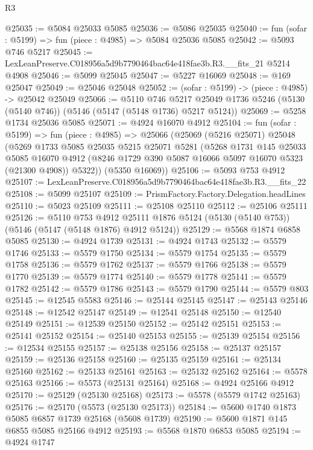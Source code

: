 \begin{lexlean}{R3}
\begin{coremodule}
@25035 := @5084 @25033 @5085
@25036 := @5086 @25035
@25040 := fun (sofar : @5199) => fun (piece : @4985) => @5084 @25036 @5085
@25042 := @5093 @746 @5217
@25045 := LexLeanPreserve.C018956a5d9b7790464bac64e418fae3b.R3.__fits_21 @5214 @4908
@25046 := @5099 @25045
@25047 := @5227 @16069
@25048 := @169 @25047
@25049 := @25046 @25048
@25052 := (sofar : @5199) -> (piece : @4985) -> @25042 @25049
@25066 := @5110
    @746
    @5217
    @25049
    @1736
    @5246
    (@5130 (@5140 @746))
    (@5146 (@5147 (@5148 @1736) @5217 @5124))
@25069 := @5258 @1734 @25036 @5085
@25071 := @4924 @16070 @4912
@25104 := fun (sofar : @5199) =>
  fun (piece : @4985) =>
  @25066
    (@25069
      (@5216 @25071)
      @25048
      (@5269
        @1733
        @5085
        @25035
        @5215
        @25071
        @5281
        (@5268
          @1731
          @145
          @25033
          @5085
          @16070
          @4912
          (@8246 @1729 @390 @5087 @16066 @5097 @16070 @5323 (@21300 @4908))
          @5322))
      (@5350 @16069))
@25106 := @5093 @753 @4912
@25107 := LexLeanPreserve.C018956a5d9b7790464bac64e418fae3b.R3.__fits_22
@25108 := @5099 @25107
@25109 := PrismFactory.Factory.Delegation.headLines
@25110 := @5023 @25109
@25111 := @25108 @25110
@25112 := @25106 @25111
@25126 := @5110
    @753
    @4912
    @25111
    @1876
    @5124
    (@5130 (@5140 @753))
    (@5146 (@5147 (@5148 @1876) @4912 @5124))
@25129 := @5568 @1874 @6858 @5085
@25130 := @4924 @1739
@25131 := @4924 @1743
@25132 := @5579 @1746
@25133 := @5579 @1750
@25134 := @5579 @1754
@25135 := @5579 @1758
@25136 := @5579 @1762
@25137 := @5579 @1766
@25138 := @5579 @1770
@25139 := @5579 @1774
@25140 := @5579 @1778
@25141 := @5579 @1782
@25142 := @5579 @1786
@25143 := @5579 @1790
@25144 := @5579 @803
@25145 := @12545 @5583
@25146 := @25144 @25145
@25147 := @25143 @25146
@25148 := @12542 @25147
@25149 := @12541 @25148
@25150 := @12540 @25149
@25151 := @12539 @25150
@25152 := @25142 @25151
@25153 := @25141 @25152
@25154 := @25140 @25153
@25155 := @25139 @25154
@25156 := @12534 @25155
@25157 := @25138 @25156
@25158 := @25137 @25157
@25159 := @25136 @25158
@25160 := @25135 @25159
@25161 := @25134 @25160
@25162 := @25133 @25161
@25163 := @25132 @25162
@25164 := @5578 @25163
@25166 := @5573 (@25131 @25164)
@25168 := @4924 @25166 @4912
@25170 := @25129 (@25130 @25168)
@25173 := @5578 (@5579 @1742 @25163)
@25176 := @25170 (@5573 (@25130 @25173))
@25184 := @5600 @1740 @1873 @5085 @6857 @1739 @25168 (@5608 @1739)
@25190 := @5600 @1871 @145 @6855 @5085 @25166 @4912
@25193 := @5568 @1870 @6853 @5085
@25194 := @4924 @1747

\end{coremodule}
\end{lexlean}
